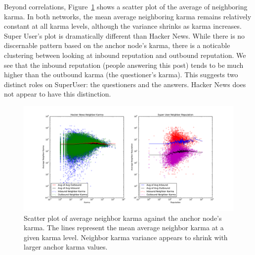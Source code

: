 \documentclass[11pt]{article}
\begin{document}
Beyond correlations, Figure~\ref{fig:karma_cliques}
shows a scatter plot of the average of neighboring karma. In both networks,
the mean average neighboring karma remains relatively constant at all
karma levels, although the variance shrinks as karma increases.
Super User's plot is dramatically different than Hacker News. While there is
no discernable pattern based on the anchor node's karma, there is a noticable
clustering between looking at inbound reputation and outbound reputation. We see
that the inbound reputation (people answering this post) tends to be much higher
than the outbound karma (the questioner's karma). This suggests two distinct
roles on SuperUser: the questioners and the answers. Hacker News does not
appear to have this distinction.

\begin{figure}[t]
\centering
\includegraphics[width=\linewidth]{karma_cliques}
\caption{Scatter plot of average neighbor karma against the anchor node's karma. 
The lines represent the mean average neighbor karma at a given karma level.
Neighbor karma variance appears to shrink with larger anchor karma values.}
\label{fig:karma_cliques}
\end{figure}
\end{document}
